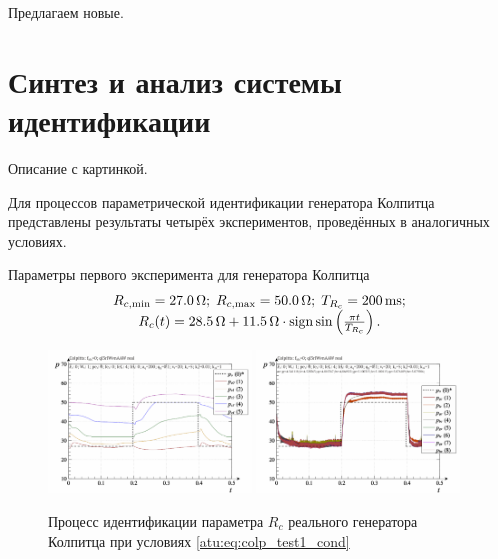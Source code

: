 Предлагаем новые.


\section{Синтез и анализ системы идентификации}  %

Описание с картинкой.

Для процессов параметрической идентификации генератора Колпитца представлены результаты четырёх экспериментов,
проведённых в аналогичных условиях.


Параметры первого эксперимента для генератора Колпитца
%
\begin{equation}
  \begin{array}{c}
    R_{c,\min} = \SI{27.0}{\ohm};
    \;
    R_{c,\max} = \SI{50.0}{\ohm};
    \;
    T_{R_c} = \SI{200}{\milli\second};
  \\
    R_c(t) = \SI{28.5}{\ohm} + \SI{11.5}{\ohm} \cdot \operatorname*{sign} \sin \left(  \frac{\pi t}{T_{R_c}}  \right).
  \end{array}
  \label{atu:eq:colp_test1_cond}
\end{equation}

\begin{figure}[htb!]
  \centerline{
    \includegraphics[width=0.48\textwidth]{p/r/colp_real_id-p_t_pi_ql3rlWvnAAW_real_d_0.png}
    \hfill
    \includegraphics[width=0.48\textwidth]{p/r/colp_real_id-p_t_p_ql3rlWvnAAW_real_d_0.png}
  }
  \caption{Процесс идентификации параметра $R_c$ реального генератора Колпитца при условиях \ref{atu:eq:colp_test1_cond} }
  \label{atu:f:colp_r_id_1}
\end{figure}


